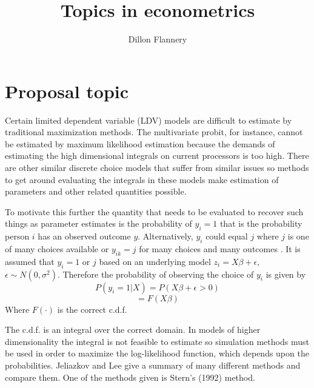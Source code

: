 \documentclass[]{article}
\title{Topics in econometrics}
\author{Dillon Flannery}
\begin{document}
\maketitle
\section*{Proposal topic} Certain limited dependent variable (LDV) models are difficult to estimate by traditional maximization methods. The multivariate probit, for instance, cannot be estimated by maximum likelihood estimation because the demands of estimating the high dimensional integrals on current processors is too high. There are other similar discrete choice models that suffer from similar issues so methods to get around evaluating the integrals in these models make estimation of parameters and other related quantities possible. 

To motivate this further the quantity that needs to be evaluated to recover such things as parameter estimates is the probability of $ y_i = 1 $ that is the probability person $ i $ has an observed outcome $ y $. Alternatively, $ y_i $ could equal $ j $ where $ j  $ is one of many choices available or $ y_{ik} = j $ for many choices and many outcomes \cite{jeliazkov2008}. It is assumed that $ y_i = 1 $ or $ j $ based on an underlying model $ z_i = X\beta + \epsilon $, $ \epsilon \sim N(0, \sigma^2) $. Therefore the probability of observing the choice of $ y_i $ is given by 
\[ P(y_i=1|X) = P(X\beta + \epsilon > 0 ) \]
\[  = F(X\beta) \]
Where $ F(\cdot) $ is the correct c.d.f. 

The c.d.f. is an integral over the correct domain. In models of higher dimensionality the integral is not feasible to estimate so simulation methods must be used in order to maximize the log-likelihood function, which depends upon the probabilities. Jeliazkov and Lee \cite{jeliazkovLee} give a summary of many different methods and compare them. One of the methods given is Stern's (1992) method. 
\end{document}
